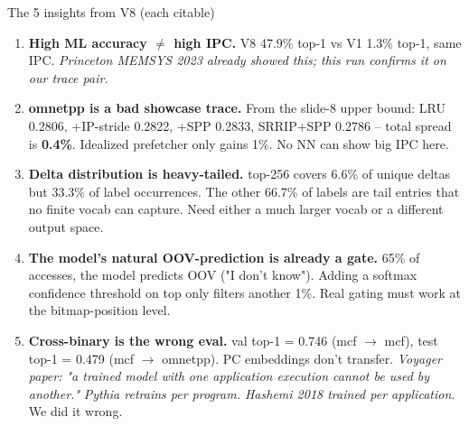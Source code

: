 \documentclass[10pt,aspectratio=169]{beamer}
\begin{document}
\begin{frame}{The 5 insights from V8 (each citable)}
  \footnotesize
  \begin{enumerate}
    \item \textbf{High ML accuracy $\neq$ high IPC.} V8 47.9\% top-1 vs V1 1.3\% top-1, same IPC.
      \emph{Princeton MEMSYS 2023 already showed this; this run confirms it on our trace pair.}

    \vspace{0.4em}
    \item \textbf{omnetpp is a bad showcase trace.} From the slide-8 upper bound:
      LRU 0.2806, +IP-stride 0.2822, +SPP 0.2833, SRRIP+SPP 0.2786 --
      total spread is \textbf{0.4\%}. Idealized prefetcher only gains 1\%. No NN can show big IPC here.

    \vspace{0.4em}
    \item \textbf{Delta distribution is heavy-tailed.} top-256 covers 6.6\% of unique deltas
      but 33.3\% of label occurrences. The other 66.7\% of labels are tail entries that no
      finite vocab can capture. Need either a much larger vocab or a different output space.

    \vspace{0.4em}
    \item \textbf{The model's natural OOV-prediction is already a gate.} 65\% of accesses,
      the model predicts OOV ("I don't know"). Adding a softmax confidence threshold on top
      only filters another 1\%. Real gating must work at the bitmap-position level.

    \vspace{0.4em}
    \item \textbf{Cross-binary is the wrong eval.} val top-1 = 0.746 (mcf $\to$ mcf),
      test top-1 = 0.479 (mcf $\to$ omnetpp). PC embeddings don't transfer.
      \emph{Voyager paper: "a trained model with one application execution cannot be used by another."}
      \emph{Pythia retrains per program. Hashemi 2018 trained per application.} We did it wrong.
  \end{enumerate}
\end{frame}
\end{document}
